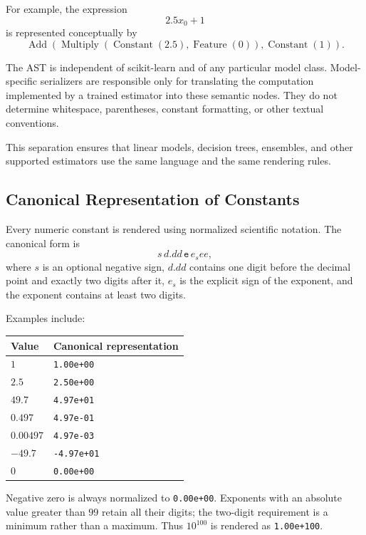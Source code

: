 For example, the expression
\[
2.5x_0+1
\]
is represented conceptually by
\[
\operatorname{Add}\left(
    \operatorname{Multiply}\left(
        \operatorname{Constant}(2.5),
        \operatorname{Feature}(0)
    \right),
    \operatorname{Constant}(1)
\right).
\]

The AST is independent of scikit-learn and of any particular model class.
Model-specific serializers are responsible only for translating the
computation implemented by a trained estimator into these semantic nodes.
They do not determine whitespace, parentheses, constant formatting, or other
textual conventions.

This separation ensures that linear models, decision trees, ensembles, and
other supported estimators use the same language and the same rendering rules.

\subsection{Canonical Representation of Constants}


Every numeric constant is rendered using normalized scientific notation. The
canonical form is
\[
s\,d.dd\,\texttt{e}\,e_see,
\]
where \(s\) is an optional negative sign, \(d.dd\) contains one digit before
the decimal point and exactly two digits after it, \(e_s\) is the explicit sign
of the exponent, and the exponent contains at least two digits.

Examples include:

\begin{center}
\begin{tabular}{ll}
\hline
Value & Canonical representation \\
\hline
\(1\)       & \texttt{1.00e+00} \\
\(2.5\)     & \texttt{2.50e+00} \\
\(49.7\)    & \texttt{4.97e+01} \\
\(0.497\)   & \texttt{4.97e-01} \\
\(0.00497\) & \texttt{4.97e-03} \\
\(-49.7\)   & \texttt{-4.97e+01} \\
\(0\)       & \texttt{0.00e+00} \\
\hline
\end{tabular}
\end{center}

Negative zero is always normalized to \texttt{0.00e+00}. Exponents with an
absolute value greater than \(99\) retain all their digits; the two-digit
requirement is a minimum rather than a maximum. Thus \(10^{100}\) is rendered
as \texttt{1.00e+100}.

